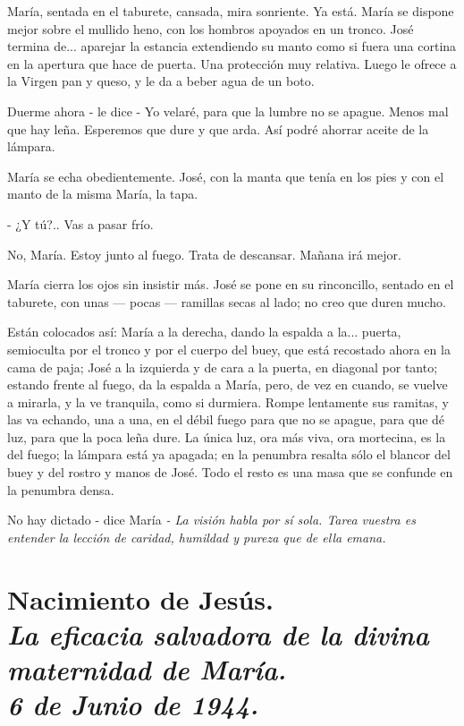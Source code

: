 \documentclass[12pt, twoside, openright]{book} %
\begin{document}
María, sentada en el taburete, cansada, mira sonriente. Ya está. María se dispone mejor sobre el mullido heno, con los hombros apoyados en un tronco. José termina de... aparejar la estancia extendiendo su manto como si fuera una cortina en la apertura que hace de puerta. Una protección muy relativa. Luego le ofrece a la Virgen pan y queso, y le da a beber agua de un boto. 

Duerme ahora - le dice - Yo velaré, para que la lumbre no se apague. Menos mal que hay leña. Esperemos que dure y que arda. Así podré ahorrar aceite de la lámpara. 

María se echa obedientemente. José, con la manta que tenía en los pies y con el manto de la misma María, la tapa. 

- ¿Y tú?.. Vas a pasar frío. 

No, María. Estoy junto al fuego. Trata de descansar. Mañana irá mejor. 

María cierra los ojos sin insistir más. José se pone en su rinconcillo, sentado en el taburete, con unas — pocas — ramillas secas al lado; no creo que duren mucho. 

Están colocados así: María a la derecha, dando la espalda a la... puerta, semioculta por el tronco y por el cuerpo del buey, que está recostado ahora en la cama de paja; José a la izquierda y de cara a la puerta, en diagonal por tanto; estando frente al fuego, da la espalda a María, pero, de vez en cuando, se vuelve a mirarla, y la ve tranquila, como si durmiera. Rompe lentamente sus ramitas, y las va echando, una a una, en el débil fuego para que no se apague, para que dé luz, para que la poca leña dure. La única luz, ora más viva, ora mortecina, es la del fuego; la lámpara está ya apagada; en la penumbra resalta sólo el blancor del buey y del rostro y manos de José. Todo el resto es una masa que se confunde en la penumbra densa. 

No hay dictado - dice María \emph{- La visión habla por sí sola. Tarea vuestra es entender la lección de caridad, humildad y pureza que de ella emana. }

\chapter*{Nacimiento de Jesús. \\ \normalfont\normalsize\textit{La eficacia salvadora de la divina maternidad de María. \\ 6 de Junio de 1944.}}
\end{document}
